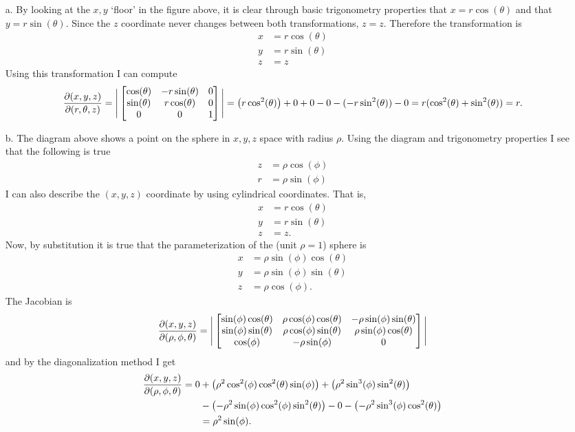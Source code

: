 \documentclass[titlepage]{article}
\begin{document}
\begin{solution}
\vspace{-2em}
\begin{itemize}
\item[a.] By looking at the $x,y$ `floor' in the figure above, it is clear through basic trigonometry properties that $x = r\cos(\theta)$ and that $y = r\sin(\theta)$. Since the $z$ coordinate never changes between both transformations, $z=z$. Therefore the transformation is
\begin{align*}
x &= r\cos(\theta) \\
y &= r\sin(\theta) \\
z &= z
\end{align*}
Using this transformation I can compute
$$\frac{\p(x,y,z)}{\p(r,\theta,z)}= \Bigg| \bmat{\cos(\theta) & -r\sin(\theta) & 0 \\ \sin(\theta) & r\cos(\theta) & 0 \\ 0 & 0 & 1} \Bigg| = \left(r\cos^2(\theta)\right) + 0 + 0 - 0 - (-r\sin^2(\theta)) - 0 = r(\cos^2(\theta) + \sin^2(\theta)) = r.$$
\item[b.] The diagram above shows a point on the sphere in $x,y,z$ space with radius $\rho$. Using the diagram and trigonometry properties I see that the following is true
\begin{align*}
z &= \rho\cos(\phi) \\
r &= \rho\sin(\phi) 
\end{align*}
I can also describe the $(x,y,z)$ coordinate by using cylindrical coordinates. That is,
\begin{align*}
x &= r\cos(\theta) \\
y &= r\sin(\theta) \\
z &= z.
\end{align*}
Now, by substitution it is true that the parameterization of the (unit $\rho = 1$) sphere  is
\begin{align*}
x &= \rho\sin(\phi)\cos(\theta)\\
y &= \rho\sin(\phi)\sin(\theta)\\
z &= \rho\cos(\phi).
\end{align*}
The Jacobian is
$$\frac{\p(x,y,z)}{\p(\rho,\phi,\theta)} = \Bigg|\bmat{\sin(\phi)\cos(\theta) & \rho\cos(\phi)\cos(\theta) & -\rho\sin(\phi)\sin(\theta) \\ \sin(\phi)\sin(\theta) & \rho\cos(\phi)\sin(\theta) & \rho\sin(\phi)\cos(\theta) \\ \cos(\phi) & -\rho\sin(\phi) & 0}\Bigg|$$
and by the diagonalization method I get 
\begin{align*}
\frac{\partial(x,y,z)}{\partial(\rho,\phi,\theta)} = 0 &+ \left(\rho^2\cos^2(\phi)\cos^2(\theta)\sin(\phi)\right) + \left(\rho^2\sin^3(\phi)\sin^2(\theta)\right) \\ 
&- \left(-\rho^2\sin(\phi)\cos^2(\phi)\sin^2(\theta)\right) - 0 - \left(-\rho^2\sin^3(\phi)\cos^2(\theta) \right) \\
&= \rho^2\sin(\phi).
\end{align*}
\end{itemize}
\end{solution}
\end{document}
